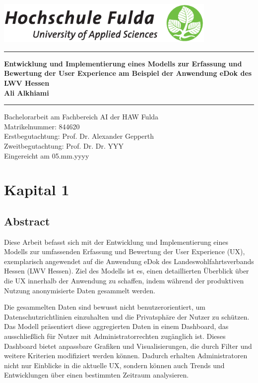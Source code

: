 \documentclass[12pt,oneside]{article}
\newcommand{\HSFTitle}[8]{

  \thispagestyle{empty}
\begin{center}
    \includegraphics[width=0.8\textwidth]{logo.eps} \\
    \vspace*{\stretch{1}}
    \end{center}

  {\parindent0cm
  \rule{\linewidth}{.7ex}}
  \begin{center}
    \vspace*{\stretch{1}}
    \sffamily\bfseries\Huge
    #1\\
    \vspace*{\stretch{1}}
    \sffamily\bfseries\large
    #3
    \vspace*{\stretch{1}}
  \end{center}
  \rule{\linewidth}{.7ex}

  \vspace*{\stretch{2}}
  \begin{center}
    \Large #2 am #5 der HAW Fulda \\
    \vspace*{\stretch{1}} 
    \large Matrikelnummer:  #4 \\[1mm]
    \large Erstbegutachtung:  #7 \\[1mm]
    \large Zweitbegutachtung:  #8 \\[1mm]
    \vspace*{\stretch{1}}
    \large Eingereicht am #6
  \end{center}
}
\begin{document}
 
 

 \HSFTitle
      {Entwicklung und Implementierung eines Modells zur Erfassung und Bewertung der User Experience am Beispiel der Anwendung eDok des LWV Hessen }        %
      {Bachelorarbeit} %
      {Ali Alkhiami}          %
      {844620}
      {Fachbereich AI}  %
      {05.mm.yyyy}        %
      {Prof. Dr. Alexander Gepperth}     %
      {Prof. Dr. Dr. YYY}    %

  \clearpage

\lhead{}
    \setcounter{page}{1}
\tableofcontents
\section{Kapital 1}
 
\begin{acronym}[hyperlinks]
\end{acronym}
 
\subsection{Abstract}

Diese Arbeit befasst sich mit der Entwicklung und Implementierung eines Modells zur umfassenden Erfassung und Bewertung der User Experience (UX), exemplarisch angewendet auf die Anwendung eDok des Landeswohlfahrtsverbands Hessen (LWV Hessen). Ziel des Modells ist es, einen detaillierten Überblick über die UX innerhalb der Anwendung zu schaffen, indem während der produktiven Nutzung anonymisierte Daten gesammelt werden.

Die gesammelten Daten sind bewusst nicht benutzerorientiert, um Datenschutzrichtlinien einzuhalten und die Privatsphäre der Nutzer zu schützen. Das Modell präsentiert diese aggregierten Daten in einem Dashboard, das ausschließlich für Nutzer mit Administratorrechten zugänglich ist. Dieses Dashboard bietet anpassbare Grafiken und Visualisierungen, die durch Filter und weitere Kriterien modifiziert werden können. Dadurch erhalten Administratoren nicht nur Einblicke in die aktuelle UX, sondern können auch Trends und Entwicklungen über einen bestimmten Zeitraum analysieren.
\end{document}
